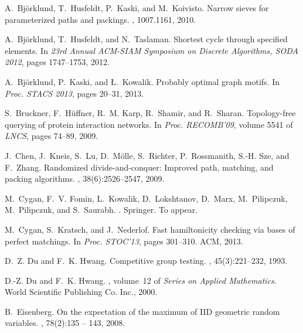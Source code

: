 \documentclass[11pt]{article}
\begin{document}
          

\begin{thebibliography}{10}

A.~Bj{\"o}rklund, T.~Husfeldt, P.~Kaski, and M.~Koivisto.
\newblock Narrow sieves for parameterized paths and packings.
, 1007.1161, 2010.

A.~Bj{\"o}rklund, T.~Husfeldt, and N.~Taslaman.
\newblock Shortest cycle through specified elements.
\newblock In {\em 23rd Annual ACM-SIAM Symposium on Discrete Algorithms, SODA
  2012}, pages 1747--1753, 2012.

A.~Bj{\"o}rklund, P.~Kaski, and {\L}.~Kowalik.
\newblock Probably optimal graph motifs.
\newblock In {\em Proc. STACS 2013}, pages 20--31, 2013.

S.~Bruckner, F.~H{\"u}ffner, R.~M. Karp, R.~Shamir, and R.~Sharan.
\newblock Topology-free querying of protein interaction networks.
\newblock In {\em Proc. RECOMB'09}, volume 5541 of {\em LNCS}, pages 74--89,
  2009.

J.~Chen, J.~Kneis, S.~Lu, D.~M{\"o}lle, S.~Richter, P.~Rossmanith, S.-H. Sze,
  and F.~Zhang.
\newblock Randomized divide-and-conquer: Improved path, matching, and packing
  algorithms.
, 38(6):2526--2547, 2009.

M.~Cygan, F.~V. Fomin, L.~Kowalik, D.~Lokshtanov, D.~Marx, M.~Pilipczuk,
  M.~Pilipczuk, and S.~Saurabh.
.
\newblock Springer.
\newblock To appear.

M.~Cygan, S.~Kratsch, and J.~Nederlof.
\newblock Fast hamiltonicity checking via bases of perfect matchings.
\newblock In {\em Proc. STOC'13}, pages 301--310. ACM, 2013.

D.~Z. Du and F.~K. Hwang.
\newblock Competitive group testing.
, 45(3):221--232, 1993.

D.-Z. Du and F.~K. Hwang.
, volume~12 of
  {\em Series on Applied Mathematics}.
\newblock World Scientific Publishing Co. Inc., 2000.

B.~Eisenberg.
\newblock On the expectation of the maximum of {IID} geometric random
  variables.
, 78(2):135 -- 143, 2008.


\end{thebibliography}
\end{document}
